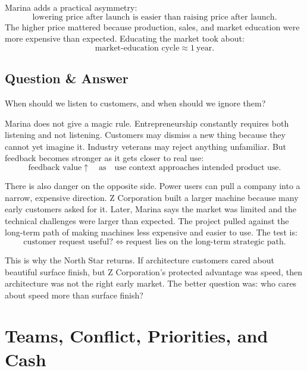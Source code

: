 Marina adds a practical asymmetry:
\begin{equation}
\text{lowering price after launch is easier than raising price after launch}.
\end{equation}
The higher price mattered because production, sales, and market education were more expensive than expected. Educating the market took about:
\begin{equation}
\text{market-education cycle}\approx 1\ \text{year}.
\end{equation}

\subsection{Question \& Answer}

When should we listen to customers, and when should we ignore them?

Marina does not give a magic rule. Entrepreneurship constantly requires both listening and not listening. Customers may dismiss a new thing because they cannot yet imagine it. Industry veterans may reject anything unfamiliar. But feedback becomes stronger as it gets closer to real use:
\begin{equation}
\text{feedback value}
\uparrow
\quad\text{as}\quad
\text{use context approaches intended product use}.
\end{equation}

There is also danger on the opposite side. Power users can pull a company into a narrow, expensive direction. Z Corporation built a larger machine because many early customers asked for it. Later, Marina says the market was limited and the technical challenges were larger than expected. The project pulled against the long-term path of making machines less expensive and easier to use. The test is:
\begin{equation}
\text{customer request useful?}
\Longleftrightarrow
\text{request lies on the long-term strategic path}.
\end{equation}

This is why the North Star returns. If architecture customers cared about beautiful surface finish, but Z Corporation's protected advantage was speed, then architecture was not the right early market. The better question was: who cares about speed more than surface finish?

\section{Teams, Conflict, Priorities, and Cash}

